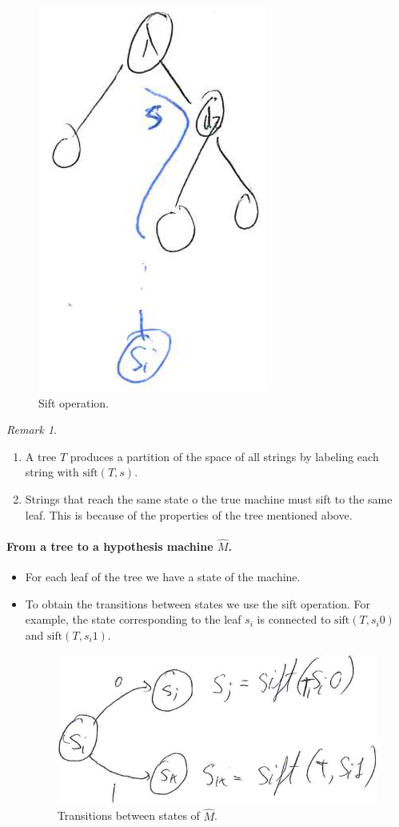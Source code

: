 \documentclass[12pt, letterpaper]{article}
\numberwithin{equation}{section} %
\newcommand{\mr}{\mathrm}
\theoremstyle{definition}
\theoremstyle{remark}
\newtheorem{remark}[theorem]{Remark}
\begin{document}
\begin{enumerate}
    \begin{figure}[H]
    \centering
    \includegraphics[width=0.1\linewidth]{img/sift-tree.png}
    \caption{Sift operation.}
    \end{figure}
    \begin{remark}~
    \begin{enumerate}[-]
    \item A tree $T$ produces a partition of the space of all strings by labeling each string with $\mr{sift}(T,s)$.
    \item Strings that reach the same state o the true machine must sift to the same leaf. This is because of the properties of the tree mentioned above.
    \end{enumerate}
    \end{remark}
    
    \paragraph{From a tree to a hypothesis machine $\widehat M$.}
    \begin{itemize}
    \item For each leaf of the tree we have a state of the machine.
    \item To obtain the transitions between states we use the sift operation. For example, the state corresponding to the leaf $s_i$ is connected to $\mr{sift}(T, s_i0)$ and  $\mr{sift}(T, s_i1)$.
        \begin{figure}[H]
        \centering
        \includegraphics[width=0.2\linewidth]{img/transitions.png}
        \caption{Transitions between states of $\widehat M$.}
        \end{figure}
    \end{itemize}
    

\end{enumerate}
\end{document}
